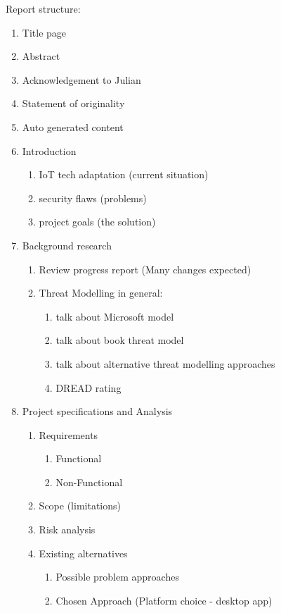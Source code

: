 Report structure:
\begin{enumerate}
	\item Title page
	
	\item Abstract
	
	\item Acknowledgement to Julian
	
	\item Statement of originality
	
	\item Auto generated content
	
	\item Introduction 
	\begin{enumerate}
		\item IoT tech adaptation (current situation)
		\item security flaws (problems)
		\item project goals (the solution)
	\end{enumerate}
	
	\item Background research
	\begin{enumerate}
		\item Review progress report (Many changes expected)
		\item Threat Modelling in general:
		\begin{enumerate}
			\item talk about Microsoft model
			\item talk about book threat model
			\item talk about alternative threat modelling approaches
			\item DREAD rating
		\end{enumerate}
	\end{enumerate}
	
	\item Project specifications and Analysis
	\begin{enumerate}
		\item Requirements
		\begin{enumerate}
			\item Functional
			\item Non-Functional
		\end{enumerate}
		\item Scope (limitations)
		\item Risk analysis
		\item Existing alternatives
		\begin{enumerate}
			\item Possible problem approaches
			\item Chosen Approach
			(Platform choice - desktop app)
		\end{enumerate}
	\end{enumerate}


\end{enumerate}
